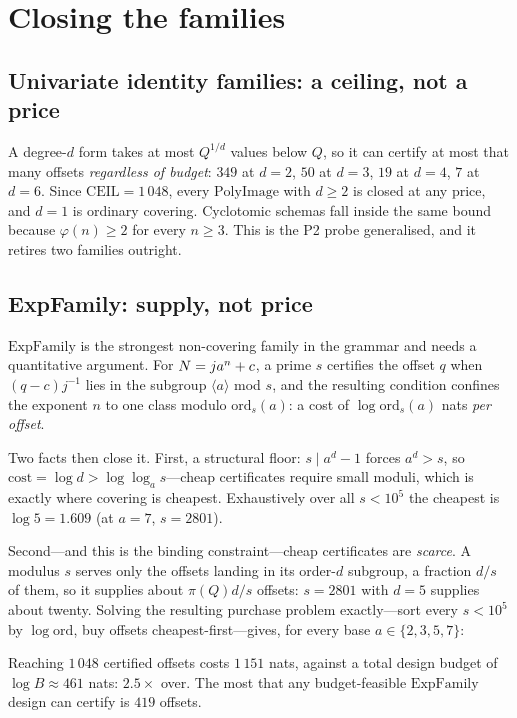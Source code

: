\section{Closing the families}\label{sec:cases}

\subsection{Univariate identity families: a ceiling, not a price}

A degree-$d$ form takes at most $Q^{1/d}$ values below $Q$, so it can certify at
most that many offsets \emph{regardless of budget}: $349$ at $d=2$, $50$ at
$d=3$, $19$ at $d=4$, $7$ at $d=6$. Since $\mathrm{CEIL}=1\,048$, every
$\mathrm{PolyImage}$ with $d\ge2$ is closed at any price, and $d=1$ is ordinary
covering. Cyclotomic schemas fall inside the same bound because $\varphi(n)\ge2$
for every $n\ge3$. This is the P2 probe generalised, and it retires two families
outright.

\subsection{ExpFamily: supply, not price}

$\mathrm{ExpFamily}$ is the strongest non-covering family in the grammar and
needs a quantitative argument. For $N=j a^{n}+c$, a prime $s$ certifies the
offset $q$ when $(q-c)j^{-1}$ lies in the subgroup $\langle a\rangle$ mod $s$,
and the resulting condition confines the exponent $n$ to one class modulo
$\mathrm{ord}_s(a)$: a cost of $\log\mathrm{ord}_s(a)$ nats \emph{per offset}.

Two facts then close it. First, a structural floor: $s\mid a^{d}-1$ forces
$a^{d}>s$, so $\mathrm{cost}=\log d>\log\log_a s$---cheap certificates require
small moduli, which is exactly where covering is cheapest. Exhaustively over all
$s<10^{5}$ the cheapest is $\log 5=1.609$ (at $a=7$, $s=2801$).

Second---and this is the binding constraint---cheap certificates are
\emph{scarce}. A modulus $s$ serves only the offsets landing in its order-$d$
subgroup, a fraction $d/s$ of them, so it supplies about $\pi(Q)d/s$ offsets:
$s=2801$ with $d=5$ supplies about twenty. Solving the resulting purchase
problem exactly---sort every $s<10^{5}$ by $\log\mathrm{ord}$, buy offsets
cheapest-first---gives, for every base $a\in\{2,3,5,7\}$:

\begin{observation}\label{obs:expfamily}
Reaching $1\,048$ certified offsets costs $1\,151$ nats, against a total design
budget of $\log B\approx461$ nats: $2.5\times$ over. The most that any
budget-feasible $\mathrm{ExpFamily}$ design can certify is $419$ offsets.
\end{observation}

